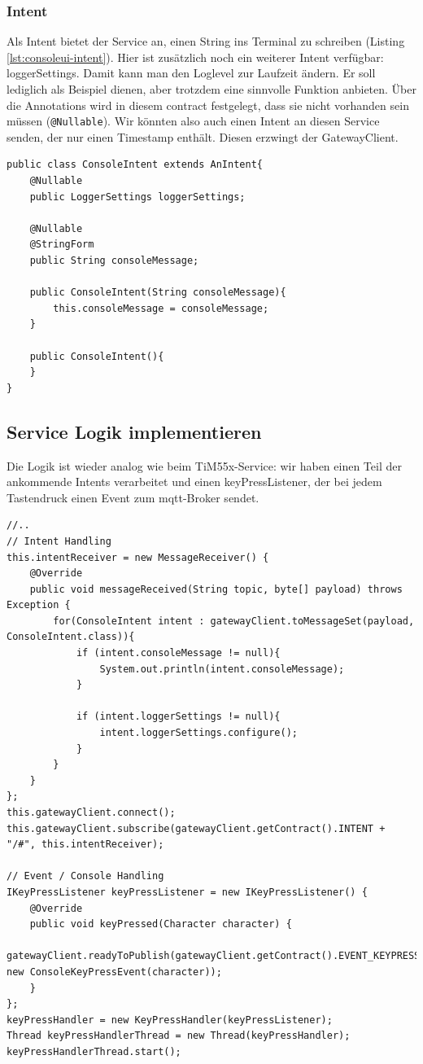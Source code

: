 \subsubsection{Intent}
Als Intent bietet der Service an, einen String ins Terminal zu schreiben (Listing \ref{lst:consoleui-intent}). Hier ist zusätzlich noch ein weiterer Intent verfügbar: loggerSettings. Damit kann man den Loglevel zur Laufzeit ändern. Er soll lediglich als Beispiel dienen, aber trotzdem eine sinnvolle Funktion anbieten. Über die Annotations wird in diesem \Gls{contract} festgelegt, dass sie nicht vorhanden sein müssen (\texttt{@Nullable}). Wir könnten also auch einen Intent an diesen Service senden, der nur einen Timestamp enthält. Diesen erzwingt der GatewayClient.
\begin{lstlisting}[caption={Intent für den ConsoleUI-Service},label={lst:consoleui-intent}]
public class ConsoleIntent extends AnIntent{
    @Nullable
    public LoggerSettings loggerSettings;

    @Nullable
    @StringForm
    public String consoleMessage;

    public ConsoleIntent(String consoleMessage){
        this.consoleMessage = consoleMessage;
    }

    public ConsoleIntent(){
    }
}
\end{lstlisting}
\subsection{Service Logik implementieren}
Die Logik ist wieder analog wie beim TiM55x-Service: wir haben einen Teil der ankommende Intents verarbeitet und einen keyPressListener, der bei jedem Tastendruck einen Event zum \acrshort{mqtt}-Broker sendet.
\begin{lstlisting}[caption={Service Logik für den ConsoleUI-Service},label={lst:consoleui-service-logic}]
//..
// Intent Handling
this.intentReceiver = new MessageReceiver() {
    @Override
    public void messageReceived(String topic, byte[] payload) throws Exception {
        for(ConsoleIntent intent : gatewayClient.toMessageSet(payload, ConsoleIntent.class)){
            if (intent.consoleMessage != null){
                System.out.println(intent.consoleMessage);
            }

            if (intent.loggerSettings != null){
                intent.loggerSettings.configure();
            }
        }
    }
};
this.gatewayClient.connect();
this.gatewayClient.subscribe(gatewayClient.getContract().INTENT + "/#", this.intentReceiver);

// Event / Console Handling
IKeyPressListener keyPressListener = new IKeyPressListener() {
    @Override
    public void keyPressed(Character character) {
        gatewayClient.readyToPublish(gatewayClient.getContract().EVENT_KEYPRESS, new ConsoleKeyPressEvent(character));
    }
};
keyPressHandler = new KeyPressHandler(keyPressListener);
Thread keyPressHandlerThread = new Thread(keyPressHandler);
keyPressHandlerThread.start();
\end{lstlisting}


